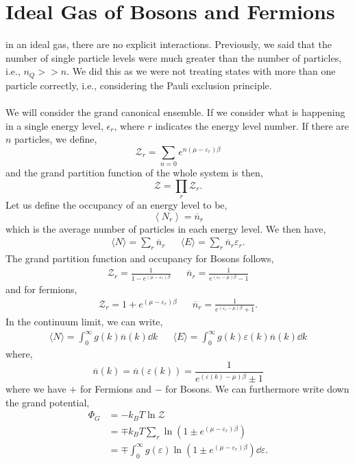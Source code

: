 \documentclass{book}
\begin{document}
\section{Ideal Gas of Bosons and Fermions}
in an ideal gas, there are no explicit interactions. Previously, we said that the number of single particle levels were much greater than the number of particles, i.e., $n_Q >> n$. We did this as we were not treating states with more than one particle correctly, i.e., considering the Pauli exclusion principle.
\\\\
We will consider the grand canonical ensemble. If we consider what is happening in a single energy level, $\epsilon_r$, where $r$ indicates the energy level number. If there are $n$ particles, we define,
\begin{equation}
	\mathcal{Z}_r = \sum_{n=0}e^{n(\mu - \varepsilon_r)\beta}
\end{equation}
and the grand partition function of the whole system is then,
\begin{equation}
	\mathcal{Z} = \prod_{r}\mathcal{Z}_r.
\end{equation}
Let us define the occupancy of an energy level to be,
\begin{equation}
	\left<N_r\right> = \overline{n}_r 
\end{equation}
which is the average number of particles in each energy level. We then have,
\begin{align}
	\langle N \rangle = \sum_r \overline{n}_r && \langle E \rangle = \sum_r\overline{n}_r\varepsilon_r.
\end{align}
The grand partition function and occupancy for Bosons follows,
\begin{align}
	\mathcal{Z}_r = \frac{1}{1 - e^{(\mu - \varepsilon_r)\beta}} && \overline{n}_r = \frac{1}{e^{(\varepsilon_r - \mu)\beta} - 1}
\end{align}
and for fermions,
\begin{align}
	\mathcal{Z}_r = 1 + e^{(\mu - \varepsilon_r)\beta} && \overline{n}_r = \frac{1}{e^{(\varepsilon_r - \mu)\beta} + 1}.
\end{align}
In the continuum limit, we can write,
\begin{align}
	\langle N \rangle = \int_0^{\infty}g(k)\overline{n}(k)\dd{k} && \langle E\rangle = \int_0^{\infty}g(k)\varepsilon(k)\overline{n}(k)\dd{k}
\end{align}
where,
\begin{equation}
	\overline{n}(k) = \overline{n}(\varepsilon(k)) = \frac{1}{e^{(\varepsilon(k) - \mu)\beta} \pm 1}
\end{equation}
where we have $+$ for Fermions and $-$ for Bosons. We can furthermore write down the grand potential,
\begin{equation}
	\begin{split}
		\Phi_G & = -k_BT \ln\mathcal{Z} \\
		& = \mp k_BT\sum_r\ln(1 \pm e^{(\mu - \varepsilon_r)\beta})\\
		& = \mp \int_0^{\infty} g(\varepsilon) \ln(1 \pm e^{(\mu - \varepsilon_r)\beta})\dd\varepsilon.
	\end{split}
\end{equation}
\end{document}
